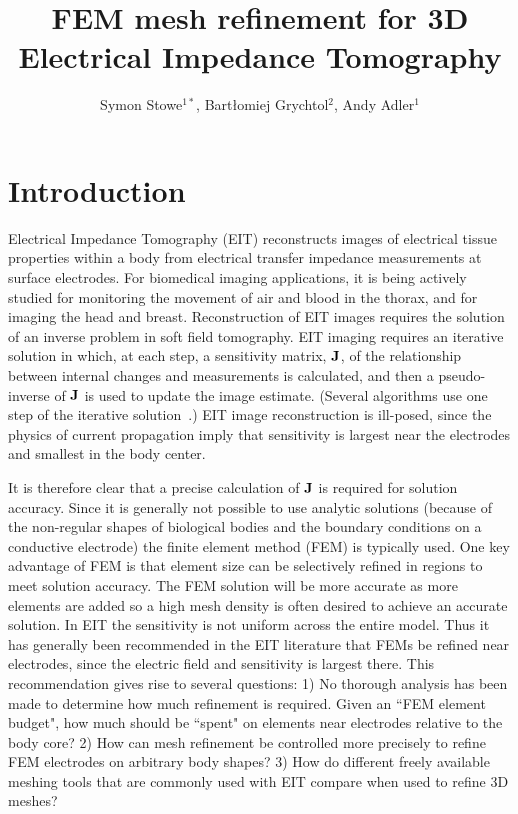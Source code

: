 \documentclass[12pt]{iopart}
\begin{document}
\title{%
FEM mesh refinement for 3D Electrical Impedance Tomography %
}

 \author{%
Symon Stowe$^{1*}$,
Bart\l{}omiej Grychtol$^2$,
Andy Adler$^1$}

\address{
$^1$Systems and Computer Engineering, Carleton University, Ottawa, Canada
$^2$OTHER
}
\vspace{10pt}

\begin{abstract}

\end{abstract}

\section{Introduction}

Electrical Impedance Tomography (EIT) reconstructs images of 
electrical tissue properties within a body from electrical
transfer impedance measurements at surface electrodes. For
biomedical imaging applications, it is being actively studied
for monitoring
the movement of air and blood in the thorax, and for imaging
the head and breast. Reconstruction of EIT images requires
the solution of an inverse problem in soft field tomography.
EIT imaging requires an iterative solution in which, at each step,
a sensitivity matrix, $\bf J$, of
the relationship between internal changes and measurements
is calculated, and then a pseudo-inverse of $\bf J$ is used
to update the image estimate. (Several algorithms use
one step of the iterative solution~\parencite{Lionheart2004}.)
EIT image reconstruction is ill-posed, since the physics of
current propagation imply that sensitivity is largest near
the electrodes and smallest in the body center.

It is therefore clear that a precise  calculation of $\bf J$ is
required for solution accuracy. Since it is generally not
possible to use analytic solutions (because of the non-regular
shapes of biological bodies and the boundary conditions on a
conductive electrode) the finite element method (FEM) is typically
used. 
One key advantage of FEM is that element size can be
selectively refined in regions to meet solution accuracy. 
The FEM solution will be more accurate as more elements are
added so a high mesh density is often desired to achieve an 
accurate solution. In EIT the sensitivity is not uniform 
across the entire model.
Thus
it has generally been recommended in the EIT literature 
that FEMs be refined near electrodes, since the electric
field and sensitivity is largest there. 
This recommendation gives rise to several questions: 
1) No thorough analysis has been made to determine how much 
refinement is required. Given an ``FEM element budget", how
much should be ``spent" on elements near electrodes relative to 
the body core?
2) How can mesh refinement be controlled more precisely 
to refine FEM electrodes on arbitrary
body shapes? 
3) How do different freely available meshing tools that are
commonly used with EIT compare when used to refine 3D meshes?
\end{document}

